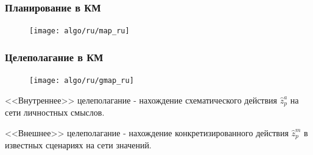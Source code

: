 \documentclass[default]{beamer}
\begin{document}
	\begin{frame}
		\frametitle{Планирование в КМ}
		
		\begin{figure}
			\texttt{[image: algo/ru/map\_ru]}
		\end{figure}
		
	\end{frame}	

	\begin{frame}
		\frametitle{Целеполагание в КМ}
		
		\begin{figure}
			\texttt{[image: algo/ru/gmap\_ru]}
		\end{figure}
		<<Внутреннее>> целеполагание - нахождение схематического действия $\hat z_p^a$ на сети личностных смыслов.
		
		<<Внешнее>> целеполагание - нахождение конкретизированного действия $\hat z_p^m$ в известных сценариях на сети значений.
	\end{frame}								
%		
%				
	
\end{document}

